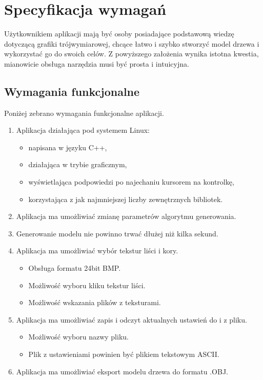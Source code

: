 \chapter{Specyfikacja wymagań}
Użytkownikiem aplikacji mają być osoby posiadające podstawową wiedzę dotyczącą grafiki trójwymiarowej,
chcące łatwo i szybko stworzyć model drzewa i wykorzystać go do swoich celów. Z powyższego założenia
wynika istotna kwestia, mianowicie obsługa narzędzia musi być prosta i intuicyjna. \\

\section{Wymagania funkcjonalne} 
Poniżej zebrano wymagania funkcjonalne aplikacji.
\begin{enumerate}
\item Aplikacja działająca pod systemem Linux: 
\begin{itemize}
\item napisana w języku C++,
\item działająca w trybie graficznym,
\item wyświetlająca podpowiedzi po najechaniu kursorem na kontrolkę,
\item korzystająca z jak najmniejszej liczby zewnętrznych bibliotek.
\end{itemize}
\item Aplikacja ma umożliwiać zmianę parametrów algorytmu generowania.
\item Generowanie modelu nie powinno trwać dłużej niż kilka sekund.
\item Aplikacja ma umożliwiać wybór tekstur liści i kory.
\begin{itemize}
\item Obsługa formatu 24bit BMP. 
\item Możliwość wyboru kliku tekstur liści.
\item Możliwość wskazania plików z teksturami.
\end{itemize}
\item  Aplikacja ma umożliwiać zapis i odczyt aktualnych ustawień do i z pliku.
\begin{itemize}
\item Możliwość wyboru nazwy pliku.
\item Plik z ustawieniami powinien być plikiem tekstowym ASCII.
\end{itemize}
\item Aplikacja ma umożliwiać eksport modelu drzewa do formatu .OBJ.

\end{enumerate}
